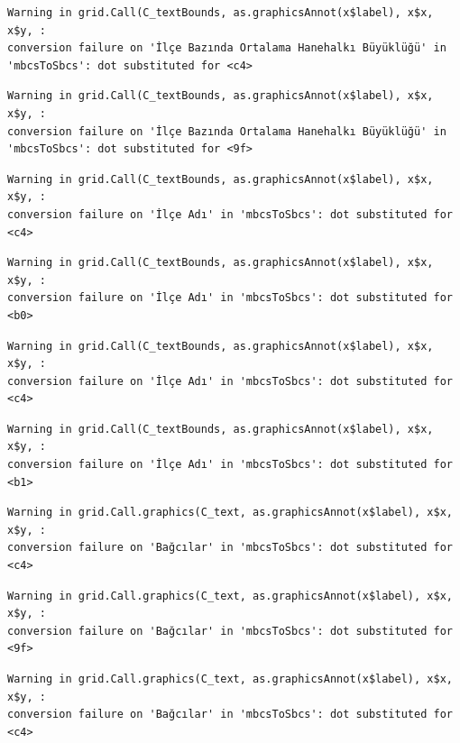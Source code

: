 \documentclass[
  11pt,
  a4paper,
  DIV=11,
  numbers=noendperiod]{scrartcl}
\begin{document}
\begin{verbatim}
Warning in grid.Call(C_textBounds, as.graphicsAnnot(x$label), x$x, x$y, :
conversion failure on 'İlçe Bazında Ortalama Hanehalkı Büyüklüğü' in
'mbcsToSbcs': dot substituted for <c4>
\end{verbatim}

\begin{verbatim}
Warning in grid.Call(C_textBounds, as.graphicsAnnot(x$label), x$x, x$y, :
conversion failure on 'İlçe Bazında Ortalama Hanehalkı Büyüklüğü' in
'mbcsToSbcs': dot substituted for <9f>
\end{verbatim}

\begin{verbatim}
Warning in grid.Call(C_textBounds, as.graphicsAnnot(x$label), x$x, x$y, :
conversion failure on 'İlçe Adı' in 'mbcsToSbcs': dot substituted for <c4>
\end{verbatim}

\begin{verbatim}
Warning in grid.Call(C_textBounds, as.graphicsAnnot(x$label), x$x, x$y, :
conversion failure on 'İlçe Adı' in 'mbcsToSbcs': dot substituted for <b0>
\end{verbatim}

\begin{verbatim}
Warning in grid.Call(C_textBounds, as.graphicsAnnot(x$label), x$x, x$y, :
conversion failure on 'İlçe Adı' in 'mbcsToSbcs': dot substituted for <c4>
\end{verbatim}

\begin{verbatim}
Warning in grid.Call(C_textBounds, as.graphicsAnnot(x$label), x$x, x$y, :
conversion failure on 'İlçe Adı' in 'mbcsToSbcs': dot substituted for <b1>
\end{verbatim}

\begin{verbatim}
Warning in grid.Call.graphics(C_text, as.graphicsAnnot(x$label), x$x, x$y, :
conversion failure on 'Bağcılar' in 'mbcsToSbcs': dot substituted for <c4>
\end{verbatim}

\begin{verbatim}
Warning in grid.Call.graphics(C_text, as.graphicsAnnot(x$label), x$x, x$y, :
conversion failure on 'Bağcılar' in 'mbcsToSbcs': dot substituted for <9f>
\end{verbatim}

\begin{verbatim}
Warning in grid.Call.graphics(C_text, as.graphicsAnnot(x$label), x$x, x$y, :
conversion failure on 'Bağcılar' in 'mbcsToSbcs': dot substituted for <c4>
\end{verbatim}
\end{document}
